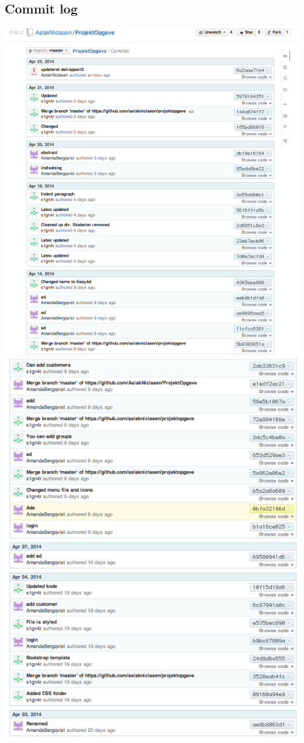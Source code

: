 \documentclass[a4paper,12pt]{article}
\begin{document}
\subsection{Commit log}
\includegraphics[width=\linewidth]{log1.png}
\newpage
\includegraphics[width=\linewidth]{log2.png}
\end{document}
